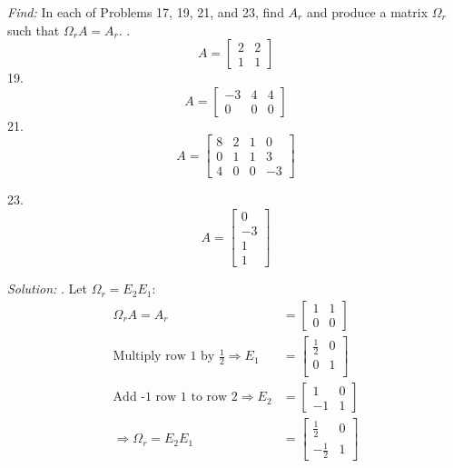 \documentclass[11pt]{homework}
\begin{document}
\emph{Find:}
\newline
In each of Problems 17, 19, 21, and 23, find $A_r$ and 
produce a matrix $\Omega_r$ such that $\Omega_r A = A_r$.
. 
\begin{equation*}
A = 
  \begin{bmatrix}
  2 & 2 \\
  1 & 1 
  \end{bmatrix}
\end{equation*}
19. 
\begin{equation*}
A = 
  \begin{bmatrix}
  -3 & 4 & 4 \\
  0 & 0  & 0
  \end{bmatrix}
\end{equation*}
21. 
\begin{equation*}
A = 
  \begin{bmatrix}
  8 & 2 &1 & 0 \\
  0 & 1 &1 & 3 \\
  4 & 0 &0 & -3 
  \end{bmatrix}
\end{equation*}

23. 
\begin{equation*}
A = 
  \begin{bmatrix}
  0  \\
  -3  \\
  1 \\
  1 
  \end{bmatrix}
\end{equation*}

\emph{Solution:}
. Let $\Omega_r = E_2 E_1$:
\begin{align*}
\Omega_r A = A_r &=
  \begin{bmatrix}
  1 & 1 \\
  0 & 0 
  \end{bmatrix} \\
\text{Multiply row 1 by $\frac{1}{2}$}
\Rightarrow
E_1 &= 
  \begin{bmatrix}
  \frac{1}{2} & 0 \\
  0           & 1 \\
  \end{bmatrix} \\
\text{Add -1 row 1 to row 2}
\Rightarrow
E_2 &= 
  \begin{bmatrix}
  1  & 0 \\
  -1 & 1 
  \end{bmatrix} \\
\Rightarrow
\Omega_r = E_2 E_1 &=
  \begin{bmatrix}
  \frac{1}{2} & 0 \\
  -\frac{1}{2} & 1
  \end{bmatrix}
\end{align*}
\end{document}
